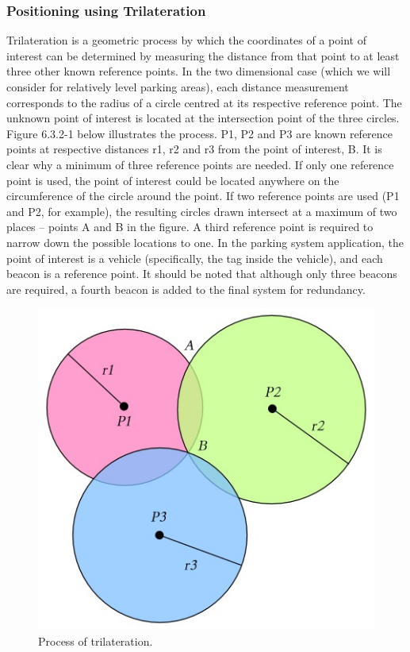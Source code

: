 \subsubsection{Positioning using Trilateration} \label{trilateration}
Trilateration is a geometric process by which the coordinates of a point of interest can be determined by measuring the distance from that point to at least three other known reference points. In the two dimensional case (which we will consider for relatively level parking areas), each distance measurement corresponds to the radius of a circle centred at its respective reference point. The unknown point of interest is located at the intersection point of the three circles.
Figure 6.3.2-1 below illustrates the process. P1, P2 and P3 are known reference points at respective distances r1, r2 and r3 from the point of interest, B. It is clear why a minimum of three reference points are needed. If only one reference point is used, the point of interest could be located anywhere on the circumference of the circle around the point. If two reference points are used (P1 and P2, for example), the resulting circles drawn intersect at a maximum of two places – points A and B in the figure. A third reference point is required to narrow down the possible locations to one.
In the parking system application, the point of interest is a vehicle (specifically, the tag inside the vehicle), and each beacon is a reference point. It should be noted that although only three beacons are required, a fourth beacon is added to the final system for redundancy. 

\begin{figure}[H]
\begin{center}
\includegraphics[scale=0.6]{data/software/2.jpg}
\caption{Process of trilateration.\cite{4}}
\label{fig:trilateration}
\end{center}
\end{figure}

